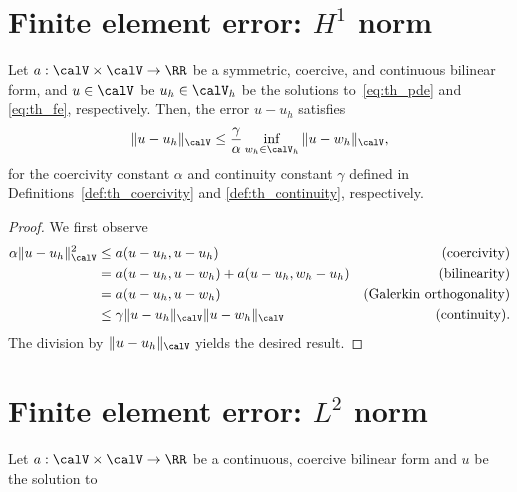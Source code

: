 \section{Finite element error: $H^1$ norm}

\begin{lemma}[Cea's]
  Let $a: \calV \times \calV \to \RR$ be a symmetric, coercive, and continuous bilinear form, and $u \in \calV$ be $u_h \in \calV_h$ be the solutions to~\eqref{eq:th_pde} and \eqref{eq:th_fe}, respectively. Then, the error $u - u_h$ satisfies
  \begin{equation*}
    \| u - u_h \|_\calV \leq \frac{\gamma}{\alpha} \inf_{w_h \in \calV_h} \| u - w_h \|_\calV,
  \end{equation*}
  for the coercivity constant $\alpha$ and continuity constant $\gamma$ defined in Definitions~\ref{def:th_coercivity} and \ref{def:th_continuity}, respectively.
  \begin{proof}
    We first observe
    \begin{align*}
      \alpha \| u - u_h \|^2_\calV
      &\leq a(u - u_h, u - u_h) & \text{(coercivity)} \\
      &= a(u - u_h, u - w_h) + a(u - u_h, w_h - u_h) &\text{(bilinearity)} \\
      &= a(u - u_h, u - w_h) &\text{(Galerkin orthogonality)} \\
      &\leq \gamma \| u - u_h \|_\calV \| u - w_h \|_\calV &\text{(continuity)}.
    \end{align*}
    The division by $\| u - u_h \|_\calV$ yields the desired result.
  \end{proof}
\end{lemma}


\section{Finite element error: $L^2$ norm}

\begin{lemma}
  Let $a: \calV \times \calV \to \RR$ be a continuous, coercive bilinear form and $u$ be the solution to 
\end{lemma}

